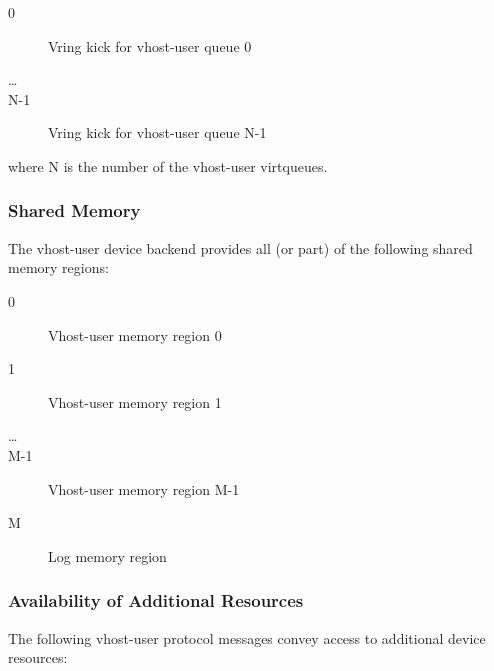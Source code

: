 \begin{description}
\item[0] Vring kick for vhost-user queue 0
\item[\ldots]
\item[N-1] Vring kick for vhost-user queue N-1
\end{description}

where N is the number of the vhost-user virtqueues.

\subsubsection{Shared Memory}\label{sec:Device Types / Vhost-user Device Backend / Additional Device Resources / Shared Memory}

The vhost-user device backend provides all (or part) of the following shared
memory regions:

\begin{description}
\item[0] Vhost-user memory region 0
\item[1] Vhost-user memory region 1
\item[\ldots]
\item[M-1] Vhost-user memory region M-1
\item[M] Log memory region
\end{description}

\subsubsection{Availability of Additional Resources}\label{sec:Device Types / Vhost-user Device Backend / Additional Device Resources / Availability of Additional Resources}

The following vhost-user protocol messages convey access to additional device
resources:

